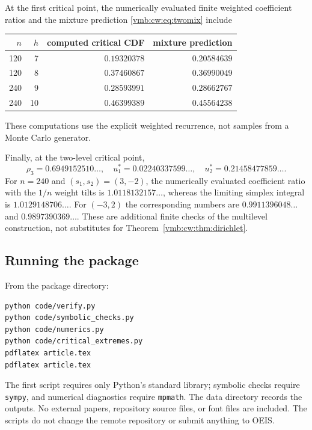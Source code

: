 \documentclass[11pt,a4paper]{article}
\numberwithin{equation}{section}
\theoremstyle{definition}\newtheorem{definition}[theorem]{Definition}
\theoremstyle{remark}\newtheorem{remark}[theorem]{Remark}
\begin{document}
At the first critical point, the numerically evaluated finite weighted
coefficient ratios and the
mixture prediction \eqref{vmb:cw:eq:twomix} include
\begin{center}
\begin{tabular}{@{}rrrr@{}}
\toprule
$n$ & $h$ & computed critical CDF & mixture prediction\\
\midrule
120&7 &$0.19320378$&$0.20584639$\\
120&8 &$0.37460867$&$0.36990049$\\
240&9 &$0.28593991$&$0.28662767$\\
240&10&$0.46399389$&$0.45564238$\\
\bottomrule
\end{tabular}
\end{center}
These computations use the explicit weighted recurrence, not samples from
a Monte Carlo generator.

Finally, at the two-level critical point,
\[
 \rho_3=0.6949152510\ldots,\quad
 u_1^*=0.02240337599\ldots,\quad
 u_2^*=0.21458477859\ldots.
\]
For $n=240$ and $(s_1,s_2)=(3,-2)$, the numerically evaluated coefficient ratio with the
$1/n$ weight tilts is $1.0118132157\ldots$, whereas the limiting simplex
integral is $1.0129148706\ldots$. For $(-3,2)$ the corresponding numbers
are $0.9911396048\ldots$ and $0.9897390369\ldots$. These are additional
finite checks of the multilevel construction, not substitutes for
Theorem~\ref{vmb:cw:thm:dirichlet}.

\subsection{Running the package}
From the package directory:
\begin{verbatim}
python code/verify.py
python code/symbolic_checks.py
python code/numerics.py
python code/critical_extremes.py
pdflatex article.tex
pdflatex article.tex
\end{verbatim}
The first script requires only Python's standard library; symbolic checks
require \texttt{sympy}, and numerical diagnostics require \texttt{mpmath}.
The data directory records the outputs. No external papers, repository
source files, or font files are included. The scripts do not change the
remote repository or submit anything to OEIS.
\end{document}
